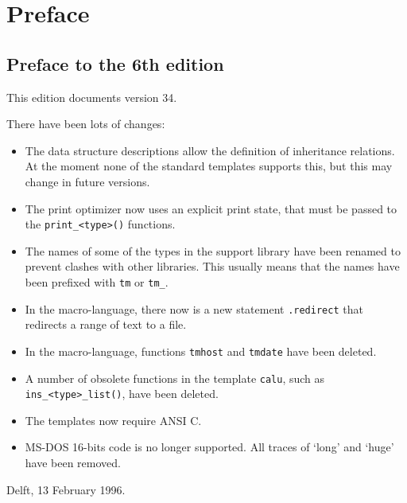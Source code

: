 \chapter{Preface}
\label{s.preface}
\section{Preface to the 6th edition}
This edition documents {\Tm} version 34.
\par
There have been lots of changes:
\begin{itemize}
\item The data structure descriptions allow the definition of inheritance
      relations. At the moment none of the standard templates supports
      this, but this may change in future versions.
\item The print optimizer now uses an explicit print state, that must
      be passed to the \verb"print_<type>()" functions.
\item The names of some of the types in the {\C} support library have been
      renamed to prevent clashes with other libraries. This usually means
      that the names have been prefixed with \verb'tm' or \verb'tm_'.
\item In the {\Tm} macro-language, there now is a new statement \verb'.redirect'
      that redirects a range of text to a file.
\item In the {\Tm} macro-language, functions \verb'tmhost' and \verb'tmdate' 
      have been deleted.
\item A number of obsolete functions in the {\C} template \verb'calu', such as
      \verb"ins_<type>_list()", have been deleted.
\item The {\C} templates now require ANSI C.
\item MS-DOS 16-bits code is no longer supported. All traces of `long'
      and `huge' have been removed.
\end{itemize}
\begin{flushright}
Delft, 13 February 1996.
\end{flushright}
